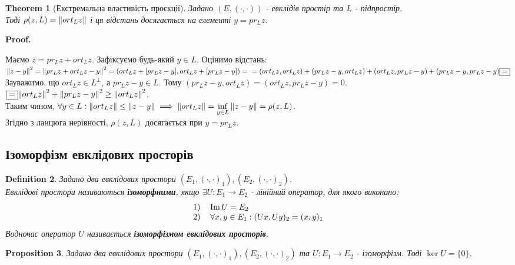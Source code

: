 \documentclass[a4paper, 10pt]{article}
\makeatletter
\theoremstyle{theoremdd}
\newtheorem{theorem}{Theorem}[subsection]
\newtheorem{definition}[theorem]{Definition}
\newtheorem{proposition}[theorem]{Proposition}
\renewenvironment{proof}[1][Proof.\\]{\par
\pushQED{\hfill \qed}%
\normalfont \topsep6\p@\@plus6\p@\relax
\trivlist
\item\relax
{\bfseries
#1\@addpunct{.}}\hspace\labelsep\ignorespaces
}{%
\popQED\endtrivlist\@endpefalse
}
\makeatother
\begin{document}
\begin{theorem}[Екстремальна властивість проєкції]
Задано $(E,(\cdot,\cdot))$ - евклідів простір та $L$ - підпростір.\\
Тоді $\rho(z,L) = \norm{ort_L z}$ і ця відстань досягається на елементі $y = pr_L z$.
\end{theorem}

\begin{proof}
Маємо $z = pr_L z + ort_L z$. Зафіксуємо будь-який $y \in L$. Оцінимо відстань:\\
$\norm{z-y}^2 = \norm{pr_L z + ort_L z - y}^2 = (ort_L z + [pr_L z - y], ort_L z + [pr_L z - y]) = \\ = (ort_L z, ort_L z) + (pr_L z - y,ort_L z) + (ort_L z,pr_L z - y) + (pr_L z-y, pr_L z-y) \boxed{=}$\\
Зауважимо, що $ort_L z \in L^\perp$, а $pr_L z - y \in L$. Тому $(pr_L z-y,ort_L z) = (ort_L z, pr_L z -y) = 0$.\\
$\boxed{=} \norm{ort_L z}^2 + \norm{pr_L z - y}^2 \geq \norm{ort_L z}^2$.\\
Таким чином, $\forall y \in L: \norm{ort_L z} \leq \norm{z-y} \implies \norm{ort_L z} = \displaystyle\inf_{y \in L} \norm{z-y} = \rho(z,L)$.\\
Згідно з ланцюга нерівності, $\rho (z,L)$ досягається при $y = pr_L z$.
\end{proof}

\subsection{Ізоморфізм евклідових просторів}
\begin{definition}
Задано два евклідових простори $(E_1,(\cdot,\cdot)_1), (E_2,(\cdot,\cdot)_2)$.\\
Евклідові простори називаються \textbf{ізоморфними}, якщо $\exists U: E_1 \to E_2$ - лінійний оператор, для якого виконано:
\begin{align*}
\begin{tabular}{cl}
1) & $\Im U = E_2$ \\
2) & $\forall x,y \in E_1: (Ux,Uy)_2 = (x,y)_1$
\end{tabular}
\end{align*}
Водночас оператор $U$ називається \textbf{ізоморфізмом евклідових просторів}.
\end{definition}

\begin{proposition}
Задано два евклідових простори $(E_1,(\cdot,\cdot)_1), (E_2,(\cdot,\cdot)_2)$ та $U: E_1 \to E_2$ - ізоморфізм. Тоді $\ker U = \{0\}$.
\end{proposition}
\end{document}
